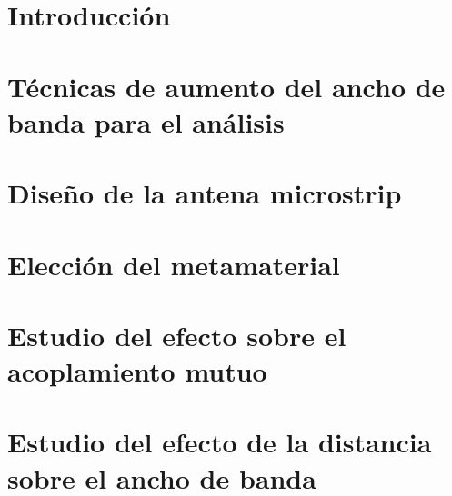 
\section{Introducción}
\section{Técnicas de aumento del ancho de banda para el análisis}
\label{sec_aumento_bw}
\section{Diseño de la antena microstrip}
\label{sec_disenio_microstrip}
\section{Elección del metamaterial}
\label{sec_eleccion}
\section{Estudio del efecto sobre el acoplamiento mutuo}
\label{sec_estudio_acoplam_mutuo}
\section{Estudio del efecto de la distancia sobre el ancho de banda}
\label{sec_efecto_distancia}

